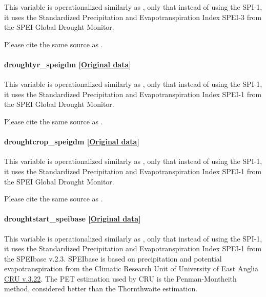 \documentclass[]{book}
\begin{document}
This variable is operationalized similarly as ,
only that instead of using the SPI-1, it uses the Standardized
Precipitation and Evapotranspiration Index SPEI-3 from the SPEI Global
Drought Monitor.

Please cite the same source as .

\paragraph{droughtyr\_speigdm
{[}\href{http://sac.csic.es/spei/map/maps.html}{Original
data}{]}}\label{droughtyr-speigdm}

This variable is operationalized similarly as ,
only that instead of using the SPI-1, it uses the Standardized
Precipitation and Evapotranspiration Index SPEI-1 from the SPEI Global
Drought Monitor.

Please cite the same source as .

\paragraph{droughtcrop\_speigdm
{[}\href{http://sac.csic.es/spei/map/maps.html}{Original
data}{]}}\label{droughtcrop-speigdm}

This variable is operationalized similarly as ,
only that instead of using the SPI-1, it uses the Standardized
Precipitation and Evapotranspiration Index SPEI-1 from the SPEI Global
Drought Monitor.

Please cite the same source as .

\paragraph{droughtstart\_speibase
{[}\href{https://digital.csic.es/handle/10261/104742}{Original
data}{]}}\label{droughtstart-speibase}

This variable is operationalized similarly as
, only that instead of using the SPI-1, it
uses the Standardized Precipitation and Evapotranspiration Index SPEI-1
from the SPEIbase v.2.3. SPEIbase is based on precipitation and
potential evapotranspiration from the Climatic Research Unit of
University of East Anglia
\href{http://browse.ceda.ac.uk/browse/badc/cru/data}{CRU v.3.22}. The
PET estimation used by CRU is the Penman-Montheith method, considered
better than the Thornthwaite estimation.
\end{document}
